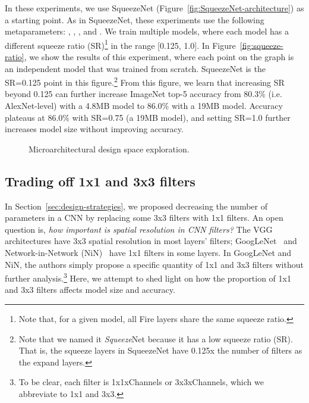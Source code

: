 \documentclass{article} \usepackage{iclr2017_conference,times}
\renewcommand{\cite}{\citep}
\def\vsp{\vspace{-0.15in}}
\begin{document}
In these experiments, we use SqueezeNet (Figure~\ref{fig:SqueezeNet-architecture}) as a starting point.
As in SqueezeNet, these experiments use the following metaparameters: , , , and .
We train multiple models, where each model has a different squeeze ratio (SR)\footnote{Note that, for a given model, all Fire layers share the same squeeze ratio.} in the range [0.125, 1.0].
In Figure~\ref{fig:squeeze-ratio}, we show the results of this experiment, where each point on the graph is an independent model that was trained from scratch.
SqueezeNet is the SR=0.125 point in this figure.\footnote{Note that we named it {\em Squeeze}Net because it has a low squeeze ratio (SR). That is, the squeeze layers in SqueezeNet have 0.125x the number of filters as the expand layers.}
From this figure, we learn that increasing SR beyond 0.125 can further increase ImageNet top-5 accuracy from 80.3\% (i.e. AlexNet-level) with a 4.8MB model to 86.0\% with a 19MB model.
Accuracy plateaus at 86.0\% with SR=0.75 (a 19MB model), and setting SR=1.0 further increases model size without improving accuracy.

\begin{figure}[!t]
	\centering
	\hspace{5pt}
	\label{fig:macroDSE}
	\caption{Microarchitectural design space exploration.}
\end{figure}


\subsection{Trading off 1x1 and 3x3 filters}
\label{sec:pct_3x3}
\vsp

In Section~\ref{sec:design-strategies}, we proposed decreasing the number of parameters in a CNN by replacing some 3x3 filters with 1x1 filters.
An open question is, {\em how important is spatial resolution in CNN filters?}
The VGG~\cite{VGG-19} architectures have 3x3 spatial resolution in most layers' filters; GoogLeNet~\cite{googlenet} and Network-in-Network (NiN)~\cite{NiN} have 1x1 filters in some layers.
In GoogLeNet and NiN, the authors simply propose a specific quantity of 1x1 and 3x3 filters without further analysis.\footnote{To be clear, each filter is 1x1xChannels or 3x3xChannels, which we abbreviate to 1x1 and 3x3.}
Here, we attempt to shed light on how the proportion of 1x1 and 3x3 filters affects model size and accuracy.
\end{document}
